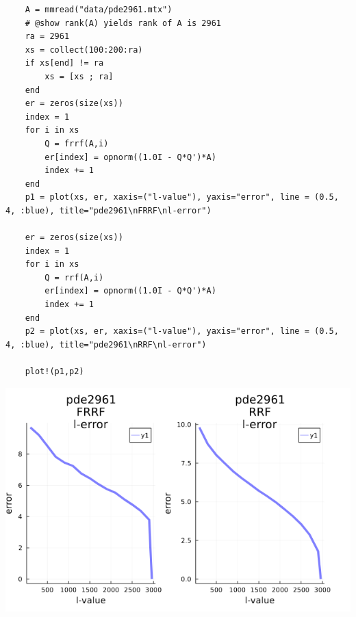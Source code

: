\documentclass[11pt,a4paper]{article}
\theoremstyle{definition}
\begin{document}
	\begin{lstlisting}
	A = mmread("data/pde2961.mtx")
	# @show rank(A) yields rank of A is 2961
	ra = 2961
	xs = collect(100:200:ra)
	if xs[end] != ra
	    xs = [xs ; ra]
	end
	er = zeros(size(xs))
	index = 1
	for i in xs 
	    Q = frrf(A,i)
	    er[index] = opnorm((1.0I - Q*Q')*A)
	    index += 1
	end
	p1 = plot(xs, er, xaxis=("l-value"), yaxis="error", line = (0.5, 4, :blue), title="pde2961\nFRRF\nl-error")
	
	er = zeros(size(xs))
	index = 1
	for i in xs 
	    Q = rrf(A,i)
	    er[index] = opnorm((1.0I - Q*Q')*A)
	    index += 1
	end
	p2 = plot(xs, er, xaxis=("l-value"), yaxis="error", line = (0.5, 4, :blue), title="pde2961\nRRF\nl-error")
	
	plot!(p1,p2)
	\end{lstlisting}
	\includegraphics[scale=0.5]{images/4.5_2.png}
\end{document}
